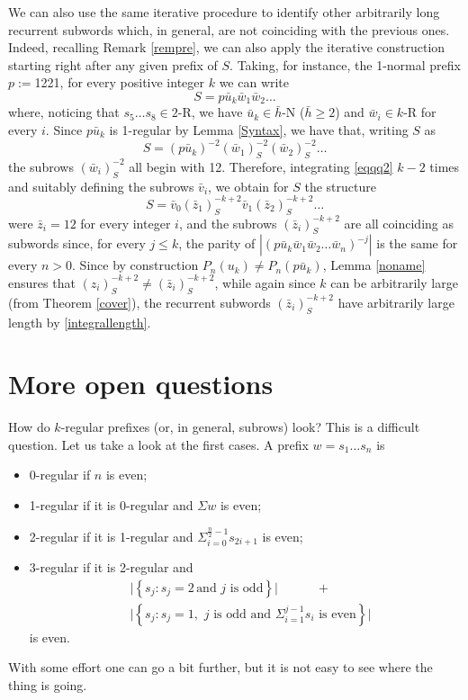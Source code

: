 \documentclass[10pt,a4paper]{article}
\begin{document}
We can also use the same iterative procedure to identify other arbitrarily long recurrent subwords which, in general, are not coinciding with the previous ones. Indeed, recalling Remark \ref{rempre}, we can also apply the iterative construction starting right after any given prefix of $S$. Taking, for instance, the 1-normal prefix $p:=$1221, for every positive integer $k$ we can write
\begin{equation*}
S=p\bar{u}_k \bar{w}_1 \bar{w}_2\dots  
\end{equation*}
 where, noticing that $s_5\dots s_8\in 2$-R, we have $\bar{u}_k\in \bar{h}$-N ($\bar{h}\ge 2$) and $\bar{w}_i\in k$-R for every $i$. Since $p\bar{u}_k$ is 1-regular by Lemma \ref{Syntax}, we have that, writing $S$ as
\begin{equation}
S=(p\bar{u}_{k})^{-2} (\bar{w}_1)_S^{-2} (\bar{w}_2)_S^{-2}\dots 
\label{eqqq2}
\end{equation}
the subrows $(\bar{w}_i)_S^{-2}$ all begin with 12. Therefore, integrating \eqref{eqqq2} $k-2$ times and suitably defining the subrows $\bar{v}_i$, we obtain for $S$ the structure
\begin{equation*}
S=\bar{v}_0(\bar{z}_1)_S^{-k+2}\bar{v}_1 (\bar{z}_2)_S^{-k+2}\dots
\end{equation*} 
were $\bar{z}_i=12$ for every integer $i$, and the subrows $(\bar{z}_i)_S^{-k+2}$ are all coinciding as subwords since, for every $j\le k$, the parity of $|(p\bar{u}_k\bar{w}_1\bar{w}_2\dots \bar{w}_n)^{-j}|$ is the same for every $n>0$.
Since by construction $P_n(u_k)\ne P_n(p\bar{u}_k)$, Lemma \ref{noname} ensures that $(z_i)_S^{-k+2}\ne (\bar{z}_i)_S^{-k+2}$, while again since $k$ can be arbitrarily large (from Theorem \ref{cover}), the recurrent subwords $(\bar{z}_i)_S^{-k+2}$ have arbitrarily large length by \eqref{integrallength}. 

  


\section{More open questions}
\label{more}
 How do $k$-regular prefixes (or, in general, subrows) look? This is a difficult question. Let us take a look at the first cases. A prefix $w=s_1\dots s_n$ is
\begin{itemize}
\item 0-regular if $n$ is even;
\item 1-regular if it is 0-regular and $\Sigma w$ is even;
\item 2-regular if it is 1-regular and $\Sigma_{i=0}^{\frac{n}{2}-1} s_{2i+1}$ is even;
\item 3-regular if it is 2-regular and 
\begin{align*}
&\Big|\left\lbrace s_j: s_j=2\,\text{and}\,\, j\,\, \text{is odd} \right\rbrace\Big| \quad \qquad+ \\
&\Big|\left\lbrace s_j : s_j=1,\,\, j\,\, \text{is odd} \,\,\text{and}\,\, \Sigma_{i=1}^{j-1} s_i \,\,\text{is even}\right\rbrace\Big|
\end{align*}
is even.
\end{itemize}
With some effort one can go a bit further, but it is not easy to see where the thing is going.
\end{document}
